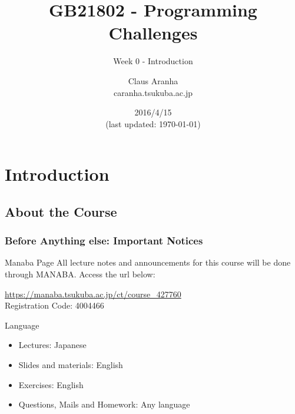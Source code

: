 \documentclass{beamer}
\title[GB21802]{GB21802 - Programming Challenges}
\subtitle[]{Week 0 - Introduction}
\author[Claus Aranha]{Claus Aranha\\{\footnotesize caranha\@@cs.tsukuba.ac.jp}}
\institute{Department of Computer Science}
\date{2016/4/15\\{\smaller(last updated: \today)}}
\begin{document}
\section{Introduction}
\subsection{About the Course}

\begin{frame}
\maketitle
\end{frame}


\begin{frame}
  \frametitle{Before Anything else: Important Notices}

  \begin{block}{Manaba Page}
    All lecture notes and announcements for this course will be done
    through MANABA. Access the url below:
    
    \medskip
    
    \url{https://manaba.tsukuba.ac.jp/ct/course_427760}\\
    Registration Code: 4004466
  \end{block}
  \begin{exampleblock}{Language}
    \begin{itemize}
      \item Lectures: Japanese
      \item Slides and materials: English
      \item Exercises: English
      \item Questions, Mails and Homework: Any language
    \end{itemize}
  \end{exampleblock}
\end{frame}
\end{document}
